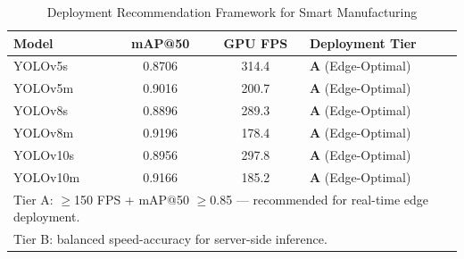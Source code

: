 
\begin{table}[!htbp]
\centering
\caption{Deployment Recommendation Framework for Smart Manufacturing}
\label{tab:deployment}
\begin{tabular}{l c c l}
\toprule
\textbf{Model} & \textbf{mAP@50} & \textbf{GPU FPS} & \textbf{Deployment Tier} \\
\midrule
YOLOv5s & 0.8706 & 314.4 & \textbf{A} (Edge-Optimal) \\
YOLOv5m & 0.9016 & 200.7 & \textbf{A} (Edge-Optimal) \\
YOLOv8s & 0.8896 & 289.3 & \textbf{A} (Edge-Optimal) \\
YOLOv8m & 0.9196 & 178.4 & \textbf{A} (Edge-Optimal) \\
YOLOv10s & 0.8956 & 297.8 & \textbf{A} (Edge-Optimal) \\
YOLOv10m & 0.9166 & 185.2 & \textbf{A} (Edge-Optimal) \\
\bottomrule
\multicolumn{4}{l}{\footnotesize Tier A: $\geq$150 FPS + mAP@50 $\geq$0.85 — recommended for real-time edge deployment.} \\
\multicolumn{4}{l}{\footnotesize Tier B: balanced speed-accuracy for server-side inference.} \\
\end{tabular}
\end{table}